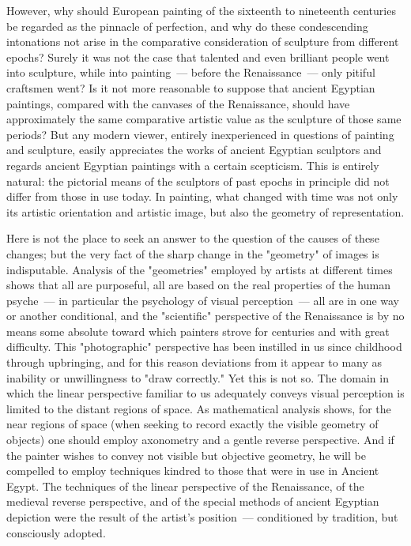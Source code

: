 However, why should European painting of the sixteenth to nineteenth centuries be
regarded as the pinnacle of perfection, and why do these condescending intonations not
arise in the comparative consideration of sculpture from different epochs? Surely it was
not the case that talented and even brilliant people went into sculpture, while into
painting~--- before the Renaissance~--- only pitiful craftsmen went? Is it not more
reasonable to suppose that ancient Egyptian paintings, compared with the canvases of
the Renaissance, should have approximately the same comparative artistic value as the
sculpture of those same periods? But any modern viewer, entirely inexperienced in
questions of painting and sculpture, easily appreciates the works of ancient Egyptian
sculptors and regards ancient Egyptian paintings with a certain scepticism. This is
entirely natural: the pictorial means of the sculptors of past epochs in principle did not
differ from those in use today. In painting, what changed with time was not only its
artistic orientation and artistic image, but also the geometry of representation.

Here is not the place to seek an answer to the question of the causes of these changes;
but the very fact of the sharp change in the "geometry" of images is indisputable.
Analysis of the "geometries" employed by artists at different times shows that all are
purposeful, all are based on the real properties of the human psyche~--- in particular the
psychology of visual perception~--- all are in one way or another conditional, and the
"scientific" perspective of the Renaissance is by no means some absolute toward which
painters strove for centuries and with great difficulty. This "photographic" perspective
has been instilled in us since childhood through upbringing, and for this reason
deviations from it appear to many as inability or unwillingness to "draw correctly."
Yet this is not so. The domain in which the linear perspective familiar to us adequately
conveys visual perception is limited to the distant regions of space. As mathematical
analysis shows, for the near regions of space (when seeking to record exactly the visible
geometry of objects) one should employ axonometry and a gentle reverse perspective.
And if the painter wishes to convey not visible but objective geometry, he will be
compelled to employ techniques kindred to those that were in use in Ancient Egypt. The
techniques of the linear perspective of the Renaissance, of the medieval reverse
perspective, and of the special methods of ancient Egyptian depiction were the result of
the artist's position~--- conditioned by tradition, but consciously adopted.

